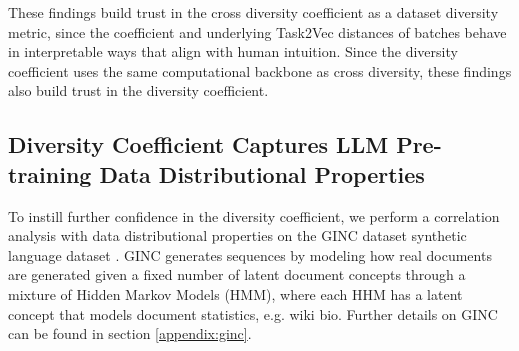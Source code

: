\begin{itemize}
\end{itemize}
These findings build trust in the cross diversity coefficient as a dataset diversity metric, since the coefficient and underlying Task2Vec distances of batches behave in interpretable ways that align with human intuition. Since the diversity coefficient uses the same computational backbone as cross diversity, these findings also build trust in the diversity coefficient. %


\subsection{Diversity Coefficient Captures LLM Pre-training Data Distributional Properties} \label{body:ginc}
To instill further confidence in the diversity coefficient, we perform a correlation analysis with data distributional properties on the GINC dataset synthetic language dataset \cite{ginc}.
GINC generates sequences by modeling how real documents are generated given a fixed number of latent document concepts through a mixture of Hidden Markov Models (HMM), where each HHM has a latent concept that models document statistics, e.g. wiki bio.
Further details on GINC can be found in section \ref{appendix:ginc}.

